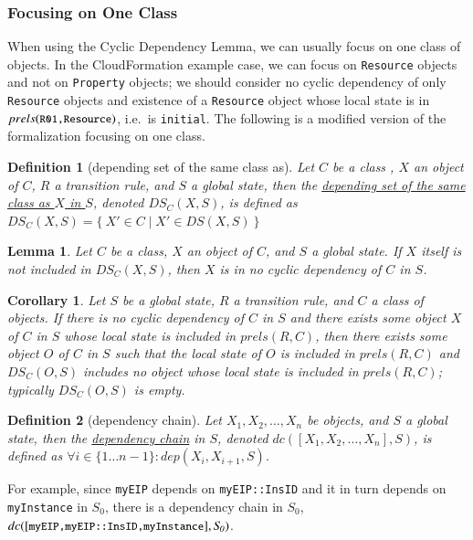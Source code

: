 \documentclass[12pt]{report}
\newtheorem{lemma}{Lemma}
\newtheorem{corollary}{Corollary}
\newtheorem{definition}{Definition}
\newcommand{\mbstt}[1]{\mbox{\small{\tt {#1}}}}
\newcommand{\ul}{\underline}
\begin{document}
\subsubsection{Focusing on One Class}
When using the Cyclic Dependency Lemma, we can usually focus on one
class of objects. In the CloudFormation example case, we can focus on
{\tt Resource} objects and not on {\tt Property} objects; we should
consider no cyclic dependency of only {\tt Resource} objects and
existence of a {\tt Resource} object whose local state is in
$prels(\mbstt{R01,Resource})$, i.e.\ is {\tt initial}. The following
is a modified version of the formalization focusing on one class.

\begin{definition}[depending set of the same class as]
Let $C$ be a class , $X$ an object of $C$, $R$ a transition
rule, and $S$ a global state, then the \ul{depending set of the same
class as $X$ in $S$}\!, denoted \ul{$\mathit{DS_C}(X,S)$}, is defined
as $\mathit{DS_C}(X,S)=\{~X'\in C\mid X'\in DS(X,S)~\}$
\end{definition}
\begin{lemma}
Let $C$ be a class, $X$ an object of $C$, and $S$ a global
state. If $X$ itself is not included in $\mathit{DS_C}(X,S)$, then $X$ is in no
cyclic dependency of $C$ in $S$\!.
\end{lemma}
\begin{corollary}
Let $S$ be a global state, $R$ a transition rule, and $C$ a
class of objects. If there is no cyclic dependency of $C$ in $S$ and
there exists some object $X$ of $C$ in $S$ whose local state is
included in $prels(R,C)$, then there exists some object $O$ of $C$ in
$S$ such that the local state of $O$ is included in $prels(R,C)$ and
$\mathit{DS_C}(O,S)$ includes no object whose local state is included in
$prels(R,C)$; typically $\mathit{DS_C}(O,S)$ is empty.
\end{corollary}
\begin{definition}[dependency chain]
Let $X_1, X_2, \dots,X_n$ be objects, and $S$ a global state, then the
\ul{dependency chain} in $S$\!, denoted \ul{$dc([X_1, X_2,\dots,
    X_n],S)$}, is defined as $\forall i \in \{1 \dots n-1\} : \mathit{dep}(X_i,
X_{i+1},S)$.
\end{definition}
For example, since {\tt myEIP} depends on {\tt myEIP::InsID} and it in
turn depends on {\tt myInstance} in $\mathit{S_0}$, there is a dependency chain
in $\mathit{S_0}$, $dc([\mbstt{myEIP,myEIP::InsID,myInstance}],\mathit{S_0})$.
\end{document}
